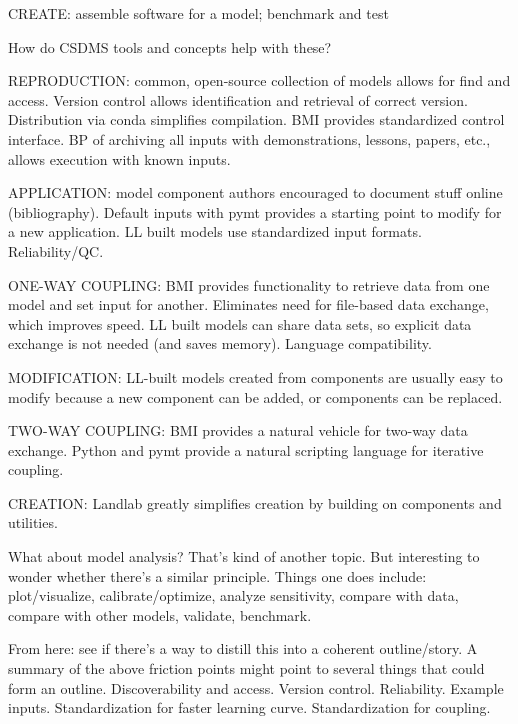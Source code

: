 \documentclass[12pt]{amsart}
\begin{document}
CREATE: assemble software for a model; benchmark and test

How do CSDMS tools and concepts help with these?

REPRODUCTION: common, open-source collection of models allows for find and access. Version control allows identification and retrieval of correct version. Distribution via conda simplifies compilation. BMI provides standardized control interface. BP of archiving all inputs with demonstrations, lessons, papers, etc., allows execution with known inputs.

APPLICATION: model component authors encouraged to document stuff online (bibliography). Default inputs with pymt provides a starting point to modify for a new application. LL built models use standardized input formats. Reliability/QC.

ONE-WAY COUPLING: BMI provides functionality to retrieve data from one model and set input for another. Eliminates need for file-based data exchange, which improves speed. LL built models can share data sets, so explicit data exchange is not needed (and saves memory). Language compatibility.

MODIFICATION: LL-built models created from components are usually easy to modify because a new component can be added, or components can be replaced.

TWO-WAY COUPLING: BMI provides a natural vehicle for two-way data exchange. Python and pymt provide a natural scripting language for iterative coupling.

CREATION: Landlab greatly simplifies creation by building on components and utilities.

What about model analysis? That's kind of another topic. But interesting to wonder whether there's a similar principle. Things one does include: plot/visualize, calibrate/optimize, analyze sensitivity, compare with data, compare with other models, validate, benchmark.

From here: see if there's a way to distill this into a coherent outline/story. A summary of the above friction points might point to several things that could form an outline. Discoverability and access. Version control. Reliability. Example inputs. Standardization for faster learning curve. Standardization for coupling.
\end{document}
